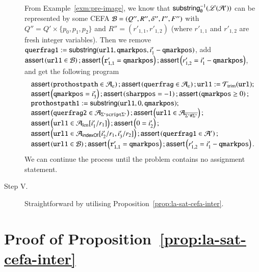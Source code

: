 \begin{example}
\begin{description}
		From Example~\ref{exm:pre-image}, we know that $\mathsf{substring}^{-1}_\emptyset(\mathscr{L}(\mathcal{A}'))$ can be represented by some CEFA $\mathcal{B}=(Q'', R'', \delta'', I'', F'')$ with $Q''= Q' \times \{p_0,p_1,p_2\}$ and $R''=(r'_{1,1}, r'_{1,2})$ (where $r'_{1,1}$ and $r'_{1,2}$ are fresh integer variables). Then we remove $\mathtt{querfrag1} := \mathsf{substring}(\mathtt{url1, qmarkpos}, i'_1 - \mathtt{qmarkpos})$, add $\textsf{assert}\left(\mathtt{url1} \in \mathcal{B}\right);\textsf{assert}\left(\mathtt{r'_{1,1}= qmarkpos}\right); \textsf{assert}\left(r'_{1,2}=i'_1 - \mathtt{qmarkpos}\right)$, and get the following program
		\[ 
		\begin{array}{l}
		\textsf{assert}\left(\mathtt{prothostpath} \in \mathcal{A}_\varepsilon\right); \textsf{assert}\left(\mathtt{querfrag} \in \mathcal{A}_\varepsilon\right); \mathtt{url1} := \mathcal{T}_{\rm trim}(\mathtt{url}); \\
		\textsf{assert}\left(\mathtt{qmarkpos} = i'_3\right); \textsf{assert}\left(\mathtt{sharppos} =-1 \right); \textsf{assert}\left(\mathtt{qmarkpos} \ge 0\right); \\ 
		\mathtt{prothostpath1} := \mathsf{substring}(\mathtt{url1}, 0, \mathtt{qmarkpos});\\
		\textsf{assert}\left(\mathtt{querfrag2} \in  \mathcal{A}_{\Sigma^*\mathtt{script}\Sigma^*}\right);  
		\textsf{assert}\left(\mathtt{url1} \in  \mathcal{A}_{\overline{\Sigma^*\#\Sigma^*}}\right); \\
		\textsf{assert}\left(\mathtt{url1} \in \mathcal{A}_{\rm len}[i'_1/r_1]\right);  \textsf{assert}\left(0= i'_2\right); \\
		\textsf{assert}\left(\mathtt{url1} \in \mathcal{A}_{\mathsf{indexOf}}[i'_2/r_1, i'_3/r_2]\right);  \textsf{assert}\left(\mathtt{querfrag1} \in \mathcal{A}'\right);\\
		\textsf{assert}\left(\mathtt{url1} \in \mathcal{B}\right);\textsf{assert}\left(\mathtt{r'_{1,1} = qmarkpos} \right); \textsf{assert}\left(r'_{1,2}=i'_1 - \mathtt{qmarkpos}\right).
		\end{array}
		\]
		We can continue the process until the problem contains no assignment statement.
		\item[Step V.]  Straightforward by utilising Proposition~\ref{prop:la-sat-cefa-inter}. 
	\end{description}
\end{example}

\section{Proof of Proposition~\ref{prop:la-sat-cefa-inter}}\label{app:sat-cefa}
 

